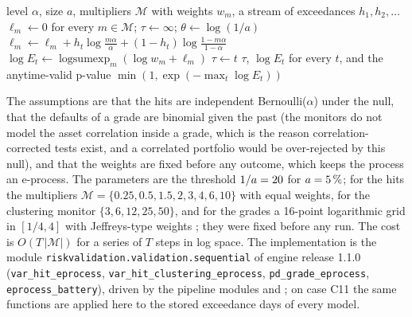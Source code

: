 \begin{algorithm}[htbp]
\caption{Anytime-valid monitor of the exceedances of a value at risk.}
\label{alg:bs15}
\begin{algorithmic}[1]
\Require level $\alpha$, size $a$, multipliers $\mathcal M$ with weights $w_m$, a stream of exceedances $h_1,h_2,\dots$
\State $\ell_m\gets 0$ for every $m\in\mathcal M$; \quad $\tau\gets\infty$; \quad $\theta\gets\log(1/a)$
    \State $\ell_m\gets \ell_m+h_t\log\frac{m\alpha}{\alpha}+(1-h_t)\log\frac{1-m\alpha}{1-\alpha}$
  \EndFor
  \State $\log E_t\gets \operatorname{logsumexp}_m(\log w_m+\ell_m)$
   \State $\tau\gets t$ \EndIf
\EndFor
\State \Return $\tau$, $\log E_t$ for every $t$, and the anytime-valid p-value $\min(1,\exp(-\max_t\log E_t))$
\end{algorithmic}
\end{algorithm}

The assumptions are that the hits are independent Bernoulli($\alpha$) under the null, that the defaults of a grade are binomial given the past (the monitors do not model the asset correlation inside a grade, which is the reason correlation-corrected tests exist, and a correlated portfolio would be over-rejected by this null), and that the weights are fixed before any outcome, which keeps the process an e-process. The parameters are the threshold $1/a=20{}$ for $a=5{}\,\%$; for the hits the multipliers $\mathcal M=\{0.25,0.5,1.5,2,3,4,6,10\}$ with equal weights, for the clustering monitor $\{3,6,12,25,50\}$, and for the grades a 16-point logarithmic grid in $[1/4,4]$ with Jeffreys-type weights \citep{proposed:jeffreys1946}; they were fixed before any run. The cost is $O(T\,|\mathcal M|)$ for a series of $T$ steps in log space. The implementation is the module \texttt{riskvalidation.validation.sequential} of engine release 1.1.0 (\texttt{var\_hit\_eprocess}, \texttt{var\_hit\_clustering\_eprocess}, \texttt{pd\_grade\_eprocess}, \texttt{eprocess\_battery}), driven by the pipeline modules  and ; on case C11 the same functions are applied here to the stored exceedance days of every model.

